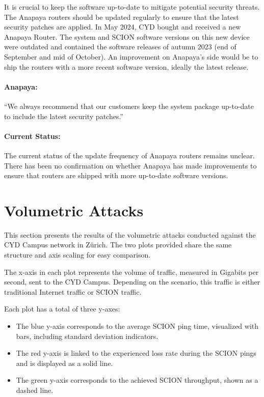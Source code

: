 It is crucial to keep the software up-to-date to mitigate potential security threats.
The Anapaya routers should be updated regularly to ensure that the latest security patches are applied.
In May 2024, CYD bought and received a new Anapaya Router.
The system and SCION software versions on this new device were outdated and contained the software releases of autumn 2023 (end of September and mid of October).
An improvement on Anapaya's side would be to ship the routers with a more recent software version, ideally the latest release.

\begin{boxH}
\paragraph{Anapaya:}
``We always recommend that our customers keep the system package up-to-date to include the latest security patches.''
\end{boxH}

\paragraph{Current Status:}
The current status of the update frequency of Anapaya routers remains unclear.
There has been no confirmation on whether Anapaya has made improvements to ensure that routers are shipped with more up-to-date software versions.


\section{Volumetric Attacks}
\label{sec:volumetric-attacks}

This section presents the results of the volumetric attacks conducted against the CYD Campus network in Zürich.
The two plots provided share the same structure and axis scaling for easy comparison.

The x-axis in each plot represents the volume of traffic, measured in Gigabits per second, sent to the CYD Campus.
Depending on the scenario, this traffic is either traditional Internet traffic or SCION traffic.

Each plot has a total of three y-axes:
\begin{itemize}
    \item The blue y-axis corresponds to the average SCION ping time, visualized with bars, including standard deviation indicators.
    \item The red y-axis is linked to  the experienced loss rate during the SCION pings and is displayed as a solid line.
    \item The green y-axis corresponds to the achieved SCION throughput, shown as a dashed line.
\end{itemize}

